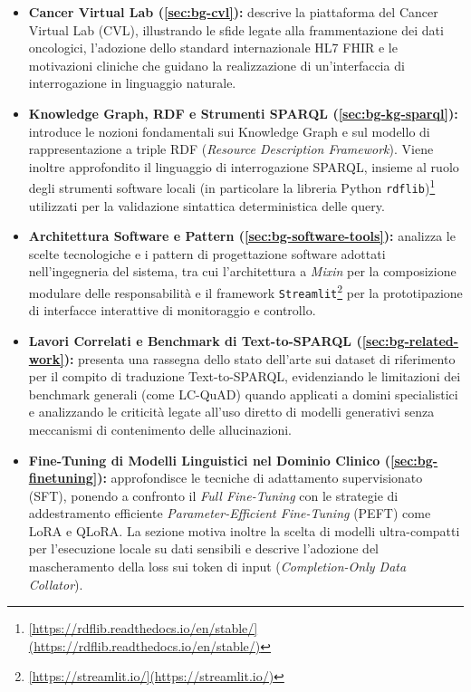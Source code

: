 \documentclass[12pt,a4paper,openright,twoside]{book}
\begin{document}
\begin{itemize}
    \item \textbf{Cancer Virtual Lab (\cref{sec:bg-cvl}):} descrive la
          piattaforma del Cancer Virtual Lab (CVL), illustrando le sfide legate
          alla frammentazione dei dati oncologici, l'adozione dello standard
          internazionale HL7 FHIR e le motivazioni cliniche che guidano la
          realizzazione di un'interfaccia di interrogazione in linguaggio
          naturale.

    \item \textbf{Knowledge Graph, RDF e Strumenti SPARQL
              (\cref{sec:bg-kg-sparql}):} introduce le nozioni fondamentali sui
          Knowledge Graph e sul modello di rappresentazione a triple RDF
          (\textit{Resource Description Framework}). Viene inoltre
          approfondito il linguaggio di interrogazione SPARQL, insieme al
          ruolo degli strumenti software locali (in particolare la libreria
          Python
          \texttt{rdflib})\footnote{\url{[https://rdflib.readthedocs.io/en/stable/](https://rdflib.readthedocs.io/en/stable/)}}
          utilizzati per la validazione sintattica deterministica delle
          query.

    \item \textbf{Architettura Software e Pattern
              (\cref{sec:bg-software-tools}):} analizza le scelte tecnologiche e
          i pattern di progettazione software adottati nell'ingegneria del
          sistema, tra cui l'architettura a \textit{Mixin} per la
          composizione modulare delle responsabilità e il framework
          \texttt{Streamlit}\footnote{\url{[https://streamlit.io/](https://streamlit.io/)}}
          per la prototipazione di interfacce interattive di monitoraggio e
          controllo.

    \item \textbf{Lavori Correlati e Benchmark di Text-to-SPARQL
              (\cref{sec:bg-related-work}):} presenta una rassegna dello stato
          dell'arte sui dataset di riferimento per il compito di traduzione
          Text-to-SPARQL, evidenziando le limitazioni dei benchmark generali
          (come LC-QuAD) quando applicati a domini specialistici e
          analizzando le criticità legate all'uso diretto di modelli
          generativi senza meccanismi di contenimento delle allucinazioni.

    \item \textbf{Fine-Tuning di Modelli Linguistici nel Dominio Clinico
              (\cref{sec:bg-finetuning}):} approfondisce le tecniche di
          adattamento supervisionato (SFT), ponendo a confronto il
          \textit{Full Fine-Tuning} con le strategie di addestramento
          efficiente \textit{Parameter-Efficient Fine-Tuning} (PEFT) come
          LoRA e QLoRA. La sezione motiva inoltre la scelta di modelli
          ultra-compatti per l'esecuzione locale su dati sensibili e
          descrive l'adozione del mascheramento della loss sui token di
          input (\textit{Completion-Only Data Collator}).
\end{itemize}
\end{document}
